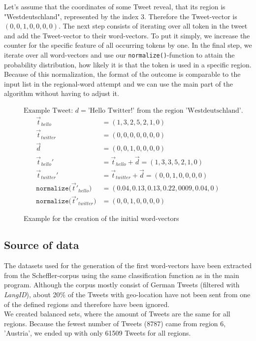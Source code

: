 \documentclass[../Main.tex]{subfiles}
\begin{document}
Let's assume that the coordinates of some Tweet reveal, that its region is "Westdeutschland", represented by the index $3$.
Therefore the Tweet-vector is $(0,0,1,0,0,0,0)$. 
The next step consists of iterating over all token in the tweet and add the Tweet-vector to their word-vectors. To put it simply, we increase the counter for the specific feature of all occurring tokens by one. 
In the final step, we iterate over all word-vectors and use our \texttt{normalize()}-function to attain the probability distribution, how likely it is that the token is used in a specific region. Because of this normalization, the format of the outcome is comparable to the input list in the regional-word attempt and we can use the main part of the algorithm without having to adjust it.

\begin{figure}
\centering $\textrm{Example Tweet: } d = \textrm{'Hello Twitter!'} \textrm{ from the region 'Westdeutschland'.}$
 \begin{align*}
    \vec{t}_{hello} &= (1,3,2,5,2,1,0) \\
     \vec{t}_{twitter} &= (0,0,0,0,0,0,0) \\
      \vec{d} &= (0,0,1,0,0,0,0) \\
     \vec{t}_{hello}' &= \vec{t}_{hello} + \vec{d} =  (1,3,3,5,2,1,0) \\
    \vec{t}_{twitter} ' &= \vec{t}_{twitter} + \vec{d} = (0,0,1,0,0,0,0) \\
     \texttt{normalize(}\vec{t}'_{hello}\texttt{)} &= (0.04, 0.13, 0.13, 0.22, 0009, 0.04, 0) \\
     \texttt{normalize(}\vec{t}'_{twitter}\texttt{)} &= (0,0,1,0,0,0,0)
  \end{align*}
  \caption{Example for the creation of the initial word-vectors}
  \label{geo_example1}
\end{figure}

\subsection{Source of data}
The datasets used for the generation of the first word-vectors have been extracted from the Scheffler-corpus using the same classification function as in the main program. Although the corpus mostly consist of German Tweets (filtered with \emph{LangID}), about 20\% of the Tweets with geo-location have not been sent from one of the defined regions and therefore have been ignored. \\
We created balanced sets, where the amount of  Tweets are the same for all regions. Because the fewest number of Tweets (8787) came from region 6, 'Austria', we ended up with only 61509 Tweets for all regions. 
\end{document}
